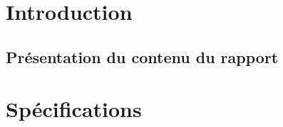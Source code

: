 





\newpage
\tableofcontents
{%
\let\oldnumberline\numberline%
\renewcommand{\numberline}{\figurename~\oldnumberline}%
\renewcommand\listfigurename{Liste des figures}
\listoffigures%
}
{%
\let\oldnumberline\numberline%
\renewcommand{\numberline}{\tablename~\oldnumberline}%
\renewcommand\listtablename{Liste des tableaux}
\listoftables%
}

\newpage
{}
\chapter{Introduction}
\section{Présentation du contenu du rapport}

\newpage
{}
\chapter{Spécifications}






